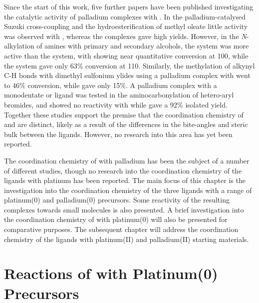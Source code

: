 Since the start of this work, five further papers have been published investigating the catalytic activity of palladium complexes with \tBuxantphos{}.\cite{Ashcroft2013, Behr2013, Friis2014, Dang2013, Liu2013c}  In the palladium-catalysed Suzuki cross-coupling and the hydroesterification of methyl oleate little activity was observed with \tBuxantphos{}, whereas the \Phxantphos{} complexes gave high yields.\cite{Ashcroft2013, Behr2013}  However, in the \emph{N}-alkylation of amines with primary and secondary alcohols, the \tBuxantphos{} system was more active than the \Phxantphos{} system, with \tBuxantphos{} showing near quantitative conversion at 100\degC{}, while the \Phxantphos{} system gave only 63\% conversion at 110\degC.  Similarly, the methylation of alkynyl C-H bonds with dimethyl sulfonium ylides using a palladium complex with \tBuxantphos{} went to 46\% conversion, while \Phxantphos{} gave only 15\%.\cite{Liu2013c}  A palladium complex with a monodentate \Phxantphos{} or \tBuxantphos{} ligand was tested in the aminocarbonylation of hetero-aryl bromides, and showed no reactivity with \tBuxantphos{} while \Phxantphos{} gave a 92\% isolated yield.\cite{Friis2014}  Together these studies support the premise that the coordination chemistry of \tBuxantphos{} and \Phxantphos{} are distinct, likely as a result of the differences in the bite-angles and steric bulk between the ligands.  However, no research into this area has yet been reported. 

The coordination chemistry of \Phxantphos{} with palladium has been the subject of a number of different studies,\cite{Zuideveld2002, Raebiger2004, Bakhmutov2012, Miedaner2004, Klingensmith2006, Petocz2004, Yin2002} though no research into the coordination chemistry of the \tBuxantphos{} ligands with platinum has been reported. The main focus of this chapter is the investigation into the coordination chemistry of the three \tBuxantphos{} ligands with a range of  platinum(0) and palladium(0) precursors.  Some reactivity of the resulting complexes towards small molecules is also presented.  A brief investigation into the coordination chemistry of \Phthixantphos{} with platinum(0) will also be presented for comparative purposes.  The subsequent chapter will address the coordination chemistry of the \tBuxantphos{} ligands with platinum(II) and palladium(II) starting materials.  


\section{Reactions of \Phthixantphos{} with Platinum(0)\\Precursors}


